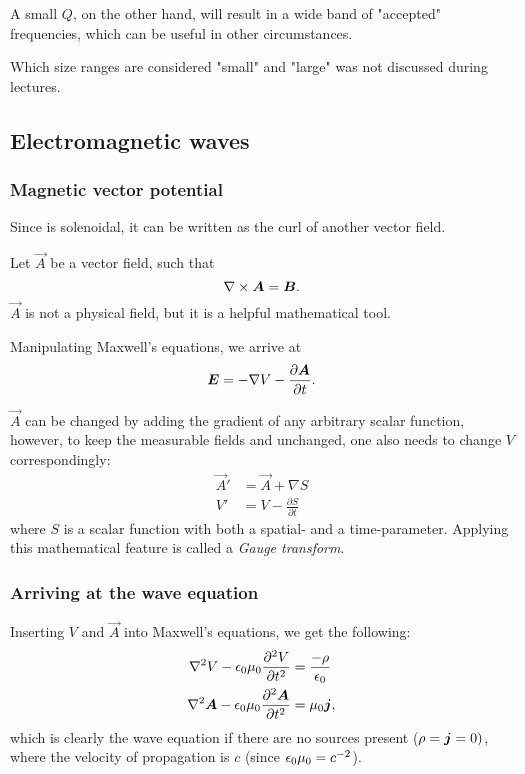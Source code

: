         A small $Q$, on the other hand, will result in a wide band of "accepted" frequencies, which can be useful in other circumstances.
    
        Which size ranges are considered "small" and "large" was not discussed during lectures. 

\subsection{Electromagnetic waves}
    \subsubsection{Magnetic vector potential}
        Since \B{} is solenoidal, it can be written as the curl of another vector field. 
        
        Let $\vec{A}$ be a vector field, such that
        \begin{equation}
            \nabla \times \bm{A} = \bm{B}.
        \end{equation}
        $\vec{A}$ is not a physical field, but it is a helpful mathematical tool. 

        Manipulating Maxwell's equations, we arrive at 
        \begin{equation}
            \bm{E} = -\nabla V - \frac{\partial \bm{A}}{\partial t}.
        \end{equation}
        
        $\vec{A}$ can be changed by adding the gradient of any arbitrary scalar function, 
        however, to keep the measurable fields \B{} and \E{} unchanged, one also needs to change $V$ correspondingly:
        \begin{align*}
            \vec{A}' &= \vec{A} + \nabla S \\
            V' &= V - \frac{\partial S}{\partial t}
        \end{align*}
        where $S$ is a scalar function with both a spatial- and a time-parameter.
        Applying this mathematical feature is called a \textit{Gauge transform}.
    \subsubsection{Arriving at the wave equation}
        Inserting $V$ and $\vec{A}$ into Maxwell's equations, we get the following: 
        \begin{align*}
            \nabla^2V - \epsilon_0\mu_0\frac{\partial^2V}{\partial t^2} &= \frac{-\rho}{\epsilon_0}\\
            \nabla^2\bm{A} - \epsilon_0\mu_0\frac{\partial^2\bm{A}}{\partial t^2} &= \mu_0\bm{j},
        \end{align*}
        which is clearly the wave equation if there are no sources present ($\rho = \bm{j} = 0)$, 
        where the velocity of propagation is $c$ (since $\epsilon_0\mu_0 = c^{-2}$).

